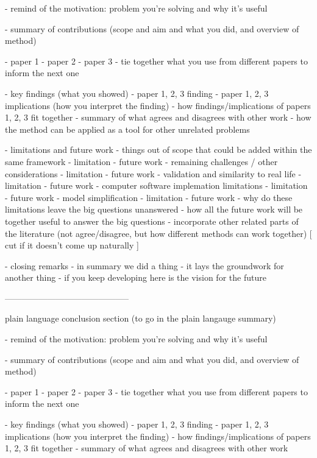 - remind of the motivation: problem you're solving and why it's useful

- summary of contributions (scope and aim and what you did, and overview of method)

    - paper 1
    - paper 2
    - paper 3
    - tie together what you use from different papers to inform the next one

- key findings (what you showed)
    - paper 1, 2, 3 finding
    - paper 1, 2, 3 implications (how you interpret the finding)
    - how findings/implications of papers 1, 2, 3 fit together
    - summary of what agrees and disagrees with other work
    - how the method can be applied as a tool for other unrelated problems

- limitations and future work
    - things out of scope that could be added within the same framework
        - limitation
        - future work
    - remaining challenges / other considerations
        - limitation
        - future work
    - validation and similarity to real life
        - limitation
        - future work
    - computer software implemation limitations
        - limitation
        - future work
    - model simplification
        - limitation
        - future work
    - why do these limitations leave the big questions unanswered
    - how all the future work will be together useful to answer the big questions
    - incorporate other related parts of the literature (not agree/disagree, but how different methods can work together)
        [ cut if it doesn't come up naturally ]

- closing remarks
    - in summary we did a thing
    - it lays the groundwork for another thing
    - if you keep developing here is the vision for the future


    --------------------------------------------

    plain language conclusion section (to go in the plain langauge summary)

    - remind of the motivation: problem you're solving and why it's useful

- summary of contributions (scope and aim and what you did, and overview of method)

    - paper 1
    - paper 2
    - paper 3
    - tie together what you use from different papers to inform the next one

- key findings (what you showed)
    - paper 1, 2, 3 finding
    - paper 1, 2, 3 implications (how you interpret the finding)
    - how findings/implications of papers 1, 2, 3 fit together
    - summary of what agrees and disagrees with other work


